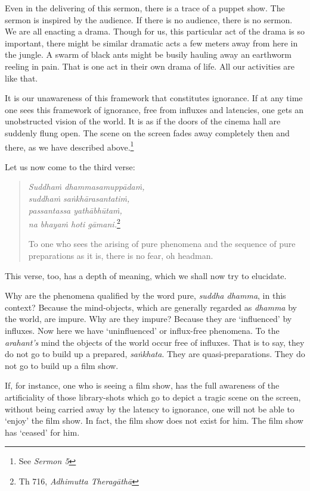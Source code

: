 Even in the delivering of this sermon, there is a trace of a puppet show. The sermon is inspired by the audience. If there is no audience, there is no sermon. We are all enacting a drama. Though for us, this particular act of the drama is so important, there might be similar dramatic acts a few meters away from here in the jungle. A swarm of black ants might be busily hauling away an earthworm reeling in pain. That is one act in their own drama of life. All our activities are like that.

It is our unawareness of this framework that constitutes ignorance. If at any time one sees this framework of ignorance, free from influxes and latencies, one gets an unobstructed vision of the world. It is as if the doors of the cinema hall are suddenly flung open. The scene on the screen fades away completely then and there, as we have described above.\footnote{See \emph{Sermon 5}}

Let us now come to the third verse:

\begin{quote}
\emph{Suddhaṁ dhammasamuppādaṁ,}\\
\emph{suddhaṁ saṅkhārasantatiṁ,}\\
\emph{passantassa yathābhūtaṁ,}\\
\emph{na bhayaṁ hoti gāmani.}\footnote{Th 716, \emph{Adhimutta Theragāthā}}

To one who sees the arising of pure phenomena and the sequence of pure preparations as it is, there is no fear, oh headman.
\end{quote}

This verse, too, has a depth of meaning, which we shall now try to elucidate.

Why are the phenomena qualified by the word pure, \emph{suddha dhamma}, in this context? Because the mind-objects, which are generally regarded as \emph{dhamma} by the world, are impure. Why are they impure? Because they are `influenced' by influxes. Now here we have `uninfluenced' or influx-free phenomena. To the \emph{arahant's} mind the objects of the world occur free of influxes. That is to say, they do not go to build up a prepared, \emph{saṅkhata}. They are quasi-preparations. They do not go to build up a film show.

If, for instance, one who is seeing a film show, has the full awareness of the artificiality of those library-shots which go to depict a tragic scene on the screen, without being carried away by the latency to ignorance, one will not be able to `enjoy' the film show. In fact, the film show does not exist for him. The film show has `ceased' for him.

